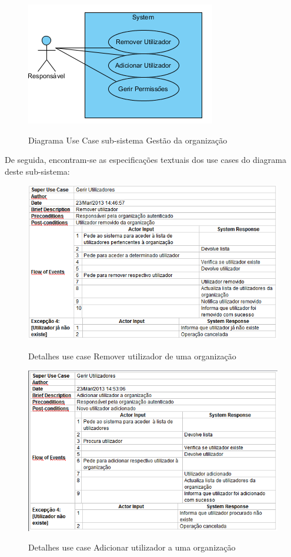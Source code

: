 ﻿\documentclass[12pt,a4paper]{article}
\begin{document}
\begin{figure}[h!]
\centering
\includegraphics[scale=1]{usecase/R_GerirUtilizadores}
\label{usecase}
\caption{Diagrama Use Case sub-sistema Gestão da organização}
\end{figure}

De seguida, encontram-se as especificações textuais dos use cases do diagrama deste sub-sistema:\\

\begin{figure}[h!]
\centering
\includegraphics[scale=0.7]{d_usecase/removerutilizador}
\label{usecase}
\caption{Detalhes use case Remover utilizador de uma organização}
\end{figure}

\begin{figure}[h!]
\centering
\includegraphics[scale=0.7]{d_usecase/adicionarutilizador}
\label{usecase}
\caption{Detalhes use case Adicionar utilizador a uma organização}
\end{figure}
\end{document}
